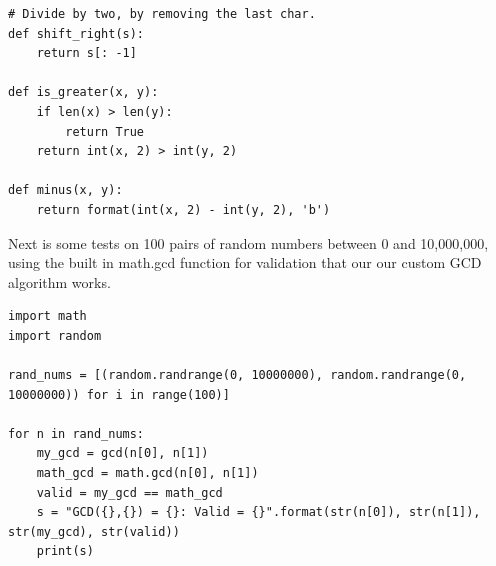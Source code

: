 \documentclass{article}
\begin{document}
\begin{enumerate}
\begin{enumerate}
\begin{lstlisting}
# Divide by two, by removing the last char.
def shift_right(s):
    return s[: -1]

def is_greater(x, y):
    if len(x) > len(y):
        return True
    return int(x, 2) > int(y, 2)

def minus(x, y):
    return format(int(x, 2) - int(y, 2), 'b')          
        \end{lstlisting}

        Next is some tests on 100 pairs of random numbers between 0 and 10,000,000, using the built in math.gcd function for validation that our our custom GCD algorithm works.

        \begin{lstlisting}
import math
import random

rand_nums = [(random.randrange(0, 10000000), random.randrange(0, 10000000)) for i in range(100)]

for n in rand_nums:
    my_gcd = gcd(n[0], n[1])
    math_gcd = math.gcd(n[0], n[1])
    valid = my_gcd == math_gcd
    s = "GCD({},{}) = {}: Valid = {}".format(str(n[0]), str(n[1]), str(my_gcd), str(valid))
    print(s)


\end{lstlisting}
\end{enumerate}
\end{enumerate}
\end{document}
